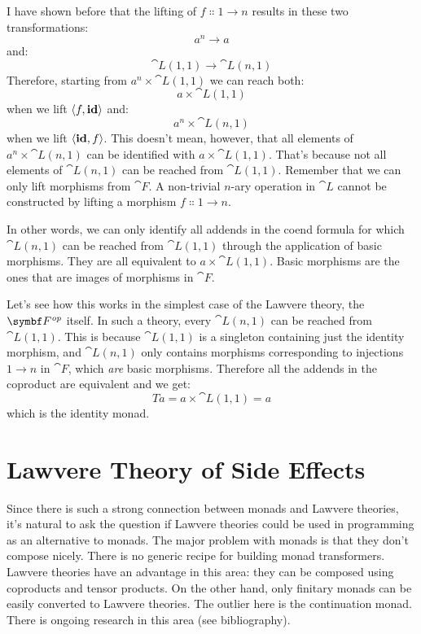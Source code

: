 \begin{figure}[H]
  \centering
\end{figure}

\noindent
I have shown before that the lifting of
$f \Colon 1 \to n$ results in these two
transformations:
\[a^n \to a\]
and:
\[\cat{L}(1, 1) \to \cat{L}(n, 1)\]
Therefore, starting from $a^n \times \cat{L}(1, 1)$ we can reach both:
\[a \times \cat{L}(1, 1)\]
when we lift $\langle f, \mathbf{id} \rangle$ and:
\[a^n \times \cat{L}(n, 1)\]
when we lift $\langle \mathbf{id}, f \rangle$. This doesn't
mean, however, that all elements of $a^n \times \cat{L}(n, 1)$ can be
identified with $a \times \cat{L}(1, 1)$. That's because not all elements
of $\cat{L}(n, 1)$ can be reached from $\cat{L}(1, 1)$. Remember
that we can only lift morphisms from $\cat{F}$. A non-trivial $n$-ary
operation in $\cat{L}$ cannot be constructed by lifting a morphism
$f \Colon 1 \to n$.

In other words, we can only identify all addends in the coend formula
for which $\cat{L}(n, 1)$ can be reached from $\cat{L}(1, 1)$
through the application of basic morphisms. They are all equivalent to
$a \times \cat{L}(1, 1)$. Basic morphisms are the ones that are images of
morphisms in $\cat{F}$.

Let's see how this works in the simplest case of the Lawvere theory, the
$\Fop$ itself. In such a theory, every
$\cat{L}(n, 1)$ can be reached from $\cat{L}(1, 1)$. This is because
$\cat{L}(1, 1)$ is a singleton containing just the identity morphism,
and $\cat{L}(n, 1)$ only contains morphisms corresponding to
injections $1 \to n$ in $\cat{F}$, which \emph{are}
basic morphisms. Therefore all the addends in the coproduct are
equivalent and we get:
\[T a = a \times \cat{L}(1, 1) = a\]
which is the identity monad.

\section{Lawvere Theory of Side Effects}

Since there is such a strong connection between monads and Lawvere
theories, it's natural to ask the question if Lawvere theories could be
used in programming as an alternative to monads. The major problem with
monads is that they don't compose nicely. There is no generic recipe for
building monad transformers. Lawvere theories have an advantage in this
area: they can be composed using coproducts and tensor products. On the
other hand, only finitary monads can be easily converted to Lawvere
theories. The outlier here is the continuation monad. There is ongoing
research in this area (see bibliography).

